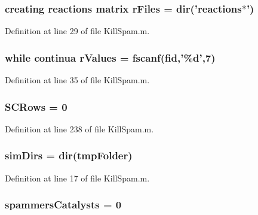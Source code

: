 \hypertarget{a00029_ad75735665492cabd747370126464fddf}{
\subsubsection[{r\-Files}]{\setlength{\rightskip}{0pt plus 5cm}creating {\bf reactions} matrix r\-Files = dir('{\bf reactions}$\ast$')}}\label{a00029_ad75735665492cabd747370126464fddf}


Definition at line 29 of file Kill\-Spam.\-m.

\hypertarget{a00029_a436a6968124e560649654a4abbd9dac6}{
\subsubsection[{r\-Values}]{\setlength{\rightskip}{0pt plus 5cm}while {\bf continua} r\-Values = {\bf fscanf}({\bf fid},'\%d',7)}}\label{a00029_a436a6968124e560649654a4abbd9dac6}


Definition at line 35 of file Kill\-Spam.\-m.

\hypertarget{a00029_a4c9731061d3ea74c9ad35793b15491ab}{
\subsubsection[{S\-C\-Rows}]{\setlength{\rightskip}{0pt plus 5cm}S\-C\-Rows = 0}}\label{a00029_a4c9731061d3ea74c9ad35793b15491ab}


Definition at line 238 of file Kill\-Spam.\-m.

\hypertarget{a00029_aae5035eb84b89176ed5b06e136325eff}{
\subsubsection[{sim\-Dirs}]{\setlength{\rightskip}{0pt plus 5cm}sim\-Dirs = dir({\bf tmp\-Folder})}}\label{a00029_aae5035eb84b89176ed5b06e136325eff}


Definition at line 17 of file Kill\-Spam.\-m.

\hypertarget{a00029_aac2cfcb79655911b15197407f3e8c51c}{
\subsubsection[{spammers\-Catalysts}]{\setlength{\rightskip}{0pt plus 5cm}spammers\-Catalysts = 0}}\label{a00029_aac2cfcb79655911b15197407f3e8c51c}


